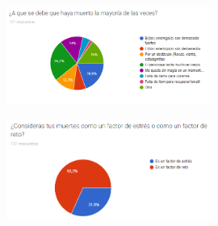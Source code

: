 \begin{figure}[H]
    \centering
    \includegraphics[width=0.6\textwidth]{Anexos/respuestas/grafica23.png}
\end{figure}

\begin{figure}[H]
    \centering
    \includegraphics[width=0.6\textwidth]{Anexos/respuestas/grafica24.png}
\end{figure}